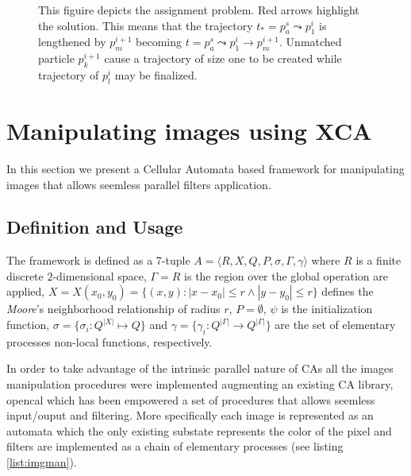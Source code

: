 \documentclass[conference]{IEEEtran}
\begin{document}
\begin{figure}
\caption{This figuire depicts the assignment problem. Red arrows highlight the solution. This means that the trajectory $t_*=p^s_a \leadsto p^i_1$  is lengthened by $p^{i+1}_m$ becoming $t=p^s_a \leadsto p^i_1 \to p^{i+1}_m$. Unmatched particle $p^{i+1}_k$ cause a  trajectory of size one to be created while trajectory of $p^{i}_l$ may be finalized.} \label{match}
\end{figure}



\section{Manipulating images using XCA}
In this section we present a Cellular Automata based framework for manipulating images that allows seemless parallel filters application.


\subsection{Definition and Usage}
The framework is defined as a 7-tuple $ A = \langle R,X,Q,P,\sigma,\Gamma,\gamma \rangle$ where $R$ is a finite discrete $2$-dimensional space, $\Gamma=R$ is the region over the global operation are applied, $X=X(x_0,y_0)=\{(x,y): \left| x-x_0\right| \leq r \wedge \left| y-y_0\right| \leq r\} $ defines the \textit{Moore}'s neighborhood relationship of radius $r$, $P=\emptyset$, $\psi$ is the initialization function, $\sigma=\{\sigma_i:Q^{|X|} \mapsto Q\}$ and   $\gamma= \{\gamma_i:Q^{|\Gamma|} \rightarrow Q^{|\Gamma|}\} $ are the set of  elementary processes non-local functions, respectively.
    
In order to take advantage of the intrinsic parallel nature of CAs all the images manipulation procedures were implemented augmenting an existing CA library, opencal\cite{dambrosio:2016} \cite{opencalurl} \cite{opencalmanual} which has been empowered  a set of procedures that allows seemless input/ouput and filtering.
More specifically each image is represented as an automata which the only existing substate represents the color of the pixel and filters are implemented as a chain of elementary processes (see listing \ref{list:imgman}).
\end{document}
